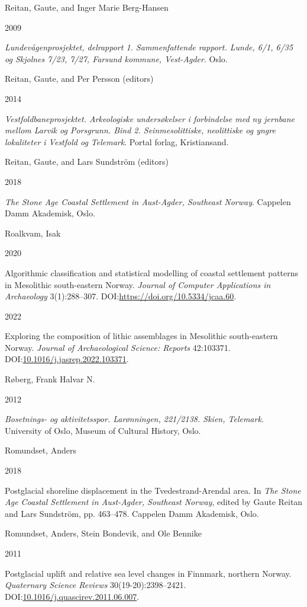 \documentclass[
]{article}
\newlength{\cslhangindent}
\newlength{\csllabelwidth}
\newlength{\cslentryspacingunit} %
\newenvironment{CSLReferences}[2] %
 {%
  \setlength{\parindent}{0pt}
  \ifodd #1
  \let\oldpar\par
  \def\par{\hangindent=\cslhangindent\oldpar}
  \fi
  \setlength{\parskip}{#2\cslentryspacingunit}
 }%
 {}
\newcommand{\CSLBlock}[1]{#1\hfill\break}
\newcommand{\CSLLeftMargin}[1]{\parbox[t]{\csllabelwidth}{#1}}
\newcommand{\CSLRightInline}[1]{\parbox[t]{\linewidth - \csllabelwidth}{#1}\break}
\begin{document}
\begin{CSLReferences}{0}{0}
\leavevmode{}%
\CSLBlock{Reitan, Gaute, and Inger Marie Berg-Hansen}
\CSLLeftMargin{ 2009}
\CSLRightInline{\emph{{Lundevågenprosjektet, delrapport 1. Sammenfattende rapport. Lunde, 6/1, 6/35 og Skjolnes 7/23, 7/27, Farsund kommune, Vest-Agder}}. Oslo.}

\leavevmode{}%
\CSLBlock{Reitan, Gaute, and Per Persson (editors)}
\CSLLeftMargin{ 2014}
\CSLRightInline{\emph{{Vestfoldbaneprosjektet. Arkeologiske undersøkelser i forbindelse med ny jernbane mellom Larvik og Porsgrunn. Bind 2. Seinmesolittiske, neolittiske og yngre lokaliteter i Vestfold og Telemark}}. Portal forlag, Kristiansand.}

\leavevmode{}%
\CSLBlock{Reitan, Gaute, and Lars Sundström (editors)}
\CSLLeftMargin{ 2018}
\CSLRightInline{\emph{{The Stone Age Coastal Settlement in Aust-Agder, Southeast Norway}}. Cappelen Damm Akademisk, Oslo.}

\leavevmode{}%
\CSLBlock{Roalkvam, Isak}
\CSLLeftMargin{ 2020}
\CSLRightInline{{Algorithmic classification and statistical modelling of coastal settlement patterns in Mesolithic south-eastern Norway}. \emph{Journal of Computer Applications in Archaeology} 3(1):288--307. DOI:\url{https://doi.org/10.5334/jcaa.60}.}

\leavevmode{}%
\CSLLeftMargin{ 2022 }
\CSLRightInline{{Exploring the composition of lithic assemblages in Mesolithic south-eastern Norway}. \emph{Journal of Archaeological Science: Reports} 42:103371. DOI:\href{https://doi.org/10.1016/j.jasrep.2022.103371}{10.1016/j.jasrep.2022.103371}.}

\leavevmode{}%
\CSLBlock{Røberg, Frank Halvar N.}
\CSLLeftMargin{ 2012}
\CSLRightInline{\emph{{Bosetnings- og aktivitetsspor. Larønningen, 221/2138. Skien, Telemark}}. University of Oslo, Museum of Cultural History, Oslo.}

\leavevmode{}%
\CSLBlock{Romundset, Anders}
\CSLLeftMargin{ 2018}
\CSLRightInline{{Postglacial shoreline displacement in the Tvedestrand-Arendal area}. In \emph{{The Stone Age Coastal Settlement in Aust-Agder, Southeast Norway}}, edited by Gaute Reitan and Lars Sundström, pp. 463--478. Cappelen Damm Akademisk, Oslo.}

\leavevmode{}%
\CSLBlock{Romundset, Anders, Stein Bondevik, and Ole Bennike}
\CSLLeftMargin{ 2011}
\CSLRightInline{Postglacial uplift and relative sea level changes in Finnmark, northern Norway. \emph{Quaternary Science Reviews} 30(19-20):2398--2421. DOI:\href{https://doi.org/10.1016/j.quascirev.2011.06.007}{10.1016/j.quascirev.2011.06.007}.}


\end{CSLReferences}
\end{document}
